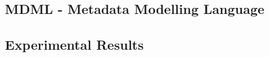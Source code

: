 \documentclass[runningheads]{llncs}
\begin{document}
\subsection{MDML - Metadata Modelling Language}

\subsubsection{}

\subsection{Experimental Results}






	
 
	
	
	
	
\end{document}
